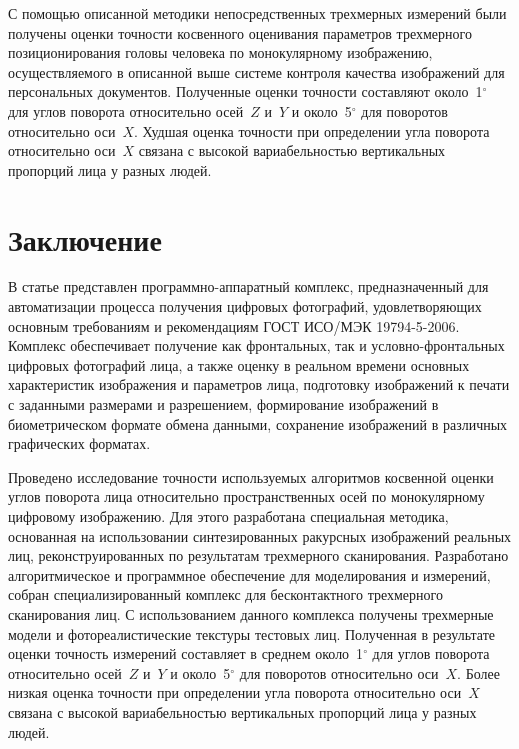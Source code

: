 \begin{multicols}{2}
С помощью описанной методики непосредственных трехмерных измерений были получены оценки точности косвенного 
оценивания па\-ра\-мет\-ров трехмерного позиционирования головы человека по монокулярному изображению, осуществляемого в 
описанной выше системе контроля качества изображений для персональных документов. Полученные оценки точности 
составляют около~1$^\circ$ для углов поворота относительно осей~$Z$ и~$Y$ и около~5$^\circ$ для поворотов относительно 
оси~$X$. Худшая оценка точности при определении угла поворота относительно оси~$X$ связана с высокой вариабельностью 
вертикальных пропорций лица у разных людей.

\section{Заключение}

В статье представлен программно-аппаратный комплекс, предназначенный для автоматизации процесса получения цифровых 
фотографий, удовле\-тво\-ря\-ющих основным требованиям и рекомендациям ГОСТ ИСО/МЭК 19794-5-2006. Комплекс обеспечивает 
получение как фронтальных, так и условно-фрон\-таль\-ных цифровых фотографий лица, а также оценку в реальном времени 
основных характеристик изображения и параметров лица, подготовку изображений к печати с заданными размерами и 
разрешением, формирование изображений в биометрическом формате обмена данными, сохранение изображений в различных 
графических форматах. 

Проведено исследование точности ис\-поль\-зу\-емых алгоритмов косвенной оценки углов поворота лица относительно 
пространственных осей по монокулярному цифровому изображению. Для этого разработана специальная методика, основанная 
на использовании синтезированных ракурсных изоб\-ра\-же\-ний реальных лиц, реконструированных по результатам трехмерного 
сканирования. Разработано алгоритмическое и программное обеспечение для моделирования и измерений, собран 
специализированный комплекс для бесконтактного трехмерного сканирования лиц. С использованием данного комплекса 
получены трехмерные модели и фотореалистические текстуры тестовых лиц. Полученная в результате оценки точность 
измерений составляет в среднем около~1$^\circ$ для углов поворота относительно осей~$Z$ и~$Y$ и около~5$^\circ$ для 
поворотов относительно оси~$X$. Более низкая оценка точности при определении угла поворота относительно оси~$X$ связана с 
высокой вариабельностью вертикальных пропорций лица у разных людей.

{\small\frenchspacing
{%
\begin{thebibliography}{9}


\end{thebibliography}}}
\end{multicols}
